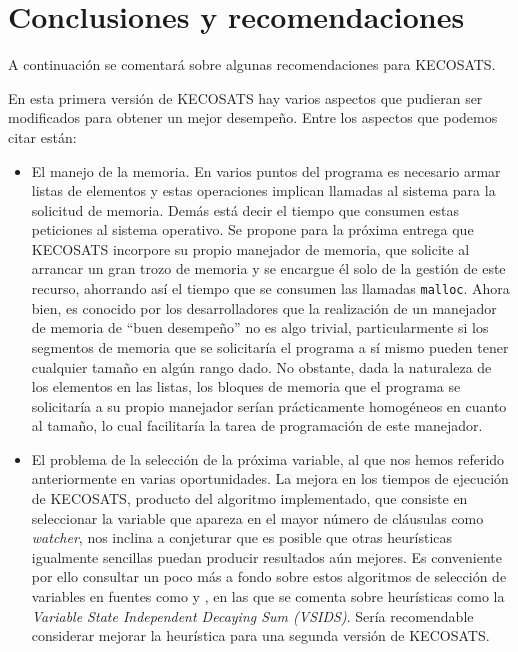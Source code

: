 \documentclass[12pt,lettersize,oneside]{article}
\begin{document}
\section{Conclusiones y recomendaciones}

A continuación se comentará sobre algunas recomendaciones para KECOSATS.

En esta primera versión de KECOSATS hay varios aspectos que pudieran ser
modificados para obtener un mejor desempeño. Entre los aspectos que podemos
citar están:
\begin{itemize}
\item El manejo de la memoria. En varios puntos del programa es necesario armar
  listas de elementos y estas operaciones implican llamadas al sistema para la
  solicitud de memoria. Demás está decir el tiempo que consumen estas peticiones
  al sistema operativo. Se propone para la próxima entrega que KECOSATS
  incorpore su propio manejador de memoria, que solicite al arrancar un gran
  trozo de memoria y se encargue él solo de la gestión de este recurso,
  ahorrando así el tiempo que se consumen las llamadas {\tt malloc}. Ahora bien,
  es conocido por los desarrolladores que la realización de un manejador de
  memoria de ``buen desempeño'' no es algo trivial, particularmente si los
  segmentos de memoria que se solicitaría el programa a sí mismo pueden tener
  cualquier tamaño en algún rango dado. No obstante, dada la naturaleza de los
  elementos en las listas, los bloques de memoria que el programa se solicitaría
  a su propio manejador serían prácticamente homogéneos en cuanto al tamaño, lo
  cual facilitaría la tarea de programación de este manejador.
\item El problema de la selección de la próxima variable, al que nos hemos
  referido anteriormente en varias oportunidades. La mejora en los tiempos de
  ejecución de KECOSATS, producto del algoritmo implementado, que consiste en
  seleccionar la variable que apareza en el mayor número de cláusulas como
  \emph{watcher}, nos inclina a conjeturar que es posible que otras heurísticas
  igualmente sencillas puedan producir resultados aún mejores. Es conveniente
  por ello consultar un poco más a fondo sobre estos algoritmos de selección de
  variables en fuentes como \cite{Zhang} y \cite{ZhangThesis}, en las que se
  comenta sobre heurísticas como la  \emph{Variable State Independent Decaying
    Sum (VSIDS)}. Sería recomendable considerar mejorar la heurística para una
  segunda versión de KECOSATS.
\end{itemize}
\end{document}
